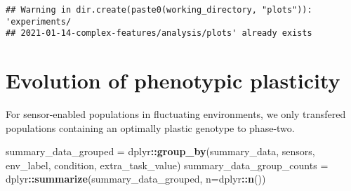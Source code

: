 \documentclass[]{book}
\newenvironment{Shaded}{\begin{snugshade}}{\end{snugshade}}
\newcommand{\AlertTok}[1]{\textcolor[rgb]{0.94,0.16,0.16}{#1}}
\newcommand{\CommentTok}[1]{\textcolor[rgb]{0.56,0.35,0.01}{\textit{#1}}}
\newcommand{\DataTypeTok}[1]{\textcolor[rgb]{0.13,0.29,0.53}{#1}}
\newcommand{\KeywordTok}[1]{\textcolor[rgb]{0.13,0.29,0.53}{\textbf{#1}}}
\newcommand{\NormalTok}[1]{#1}
\newcommand{\OperatorTok}[1]{\textcolor[rgb]{0.81,0.36,0.00}{\textbf{#1}}}
\newcommand{\StringTok}[1]{\textcolor[rgb]{0.31,0.60,0.02}{#1}}
\begin{document}
\begin{Shaded}
\end{Shaded}

\begin{verbatim}
## Warning in dir.create(paste0(working_directory, "plots")): 'experiments/
## 2021-01-14-complex-features/analysis/plots' already exists
\end{verbatim}

\hypertarget{evolution-of-phenotypic-plasticity-2}{%
\section{Evolution of phenotypic plasticity}\label{evolution-of-phenotypic-plasticity-2}}

For sensor-enabled populations in fluctuating environments, we only transfered populations containing an optimally plastic genotype to phase-two.

\begin{Shaded}
\begin{Highlighting}[]
\NormalTok{summary_data_grouped =}\StringTok{ }\NormalTok{dplyr}\OperatorTok{::}\KeywordTok{group_by}\NormalTok{(summary_data, sensors, env_label, condition, extra_task_value)}
\NormalTok{summary_data_group_counts =}\StringTok{ }\NormalTok{dplyr}\OperatorTok{::}\KeywordTok{summarize}\NormalTok{(summary_data_grouped, }\DataTypeTok{n=}\NormalTok{dplyr}\OperatorTok{::}\KeywordTok{n}\NormalTok{())}
\end{Highlighting}
\end{Shaded}
\end{document}
